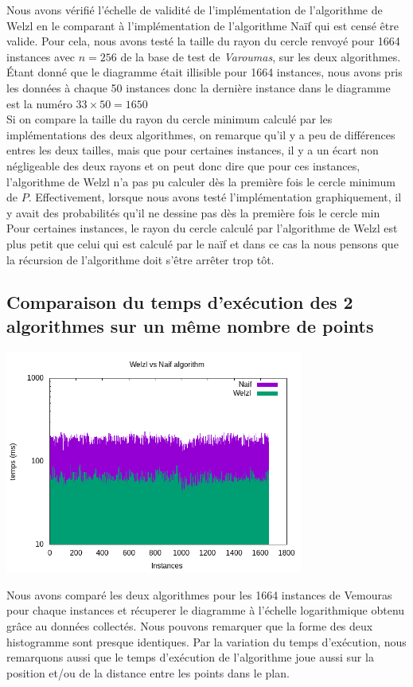\documentclass[12pt, a4paper, titlepage]{article}
\begin{document}
    Nous avons vérifié l'échelle de validité de l'implémentation de l'algorithme de Welzl en le comparant à l'implémentation de l'algorithme Naïf qui est censé être valide. Pour cela, nous avons testé la taille du rayon du cercle renvoyé pour 1664 instances avec $n=256$ de la base de test de \textit{Varoumas}, sur les deux algorithmes. Étant donné que le diagramme était illisible pour 1664 instances, nous avons pris les données à chaque 50 instances donc la dernière instance dans le diagramme est la numéro $33\times 50 = 1650$\\
    Si on compare la taille du rayon du cercle minimum calculé par les implémentations des deux algorithmes, on remarque qu'il y a peu de différences entres les deux tailles, mais que pour certaines instances, il y a un écart non négligeable des deux rayons et on peut donc dire que pour ces instances, l'algorithme de Welzl n'a pas pu calculer dès la première fois le cercle minimum de $P$. Effectivement, lorsque nous avons testé l'implémentation graphiquement, il y avait des probabilités qu'il ne dessine pas dès la première fois le cercle min \\
    Pour certaines instances, le rayon du cercle calculé par l'algorithme de Welzl est plus petit que celui qui est calculé par le naïf et dans ce cas la nous pensons que la récursion de l'algorithme doit s'être arrêter trop tôt.
    
    \subsection{Comparaison du temps d'exécution des 2 algorithmes sur un même nombre de points }
    \includegraphics[width=370px,
                     keepaspectratio,]{welzlNaif.png}
    
    Nous avons comparé les deux algorithmes pour les 1664 instances de Vemouras pour chaque instances et récuperer le diagramme à l'échelle logarithmique obtenu grâce au données collectés. Nous pouvons remarquer que la forme des deux histogramme sont presque identiques. Par la variation du temps d'exécution, nous remarquons aussi que le temps d'exécution de l'algorithme joue aussi sur la position et/ou de la distance entre les points dans le plan.\\
\end{document}
